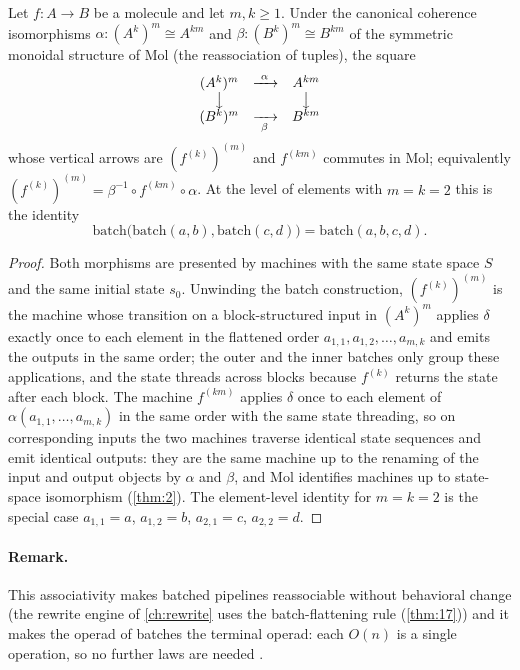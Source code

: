 \begin{theorem}\label{thm:46}
Let $f : A \to B$ be a molecule and let $m, k \geq 1$. Under the canonical coherence isomorphisms $\alpha : (A^{k})^{m} \cong A^{km}$ and $\beta : (B^{k})^{m} \cong B^{km}$ of the symmetric monoidal structure of Mol (the reassociation of tuples), the square
\[
\begin{array}{ccc}
(A^{k})^{m} & \xrightarrow{\ \alpha\ } & A^{km} \\
\big\downarrow & & \big\downarrow \\
(B^{k})^{m} & \xrightarrow[\ \beta\ ]{} & B^{km}
\end{array}
\]
whose vertical arrows are $(f^{(k)})^{(m)}$ and $f^{(km)}$ commutes in Mol; equivalently $(f^{(k)})^{(m)} = \beta^{-1} \circ f^{(km)} \circ \alpha$. At the level of elements with $m = k = 2$ this is the identity
\[
\mathrm{batch}\bigl (\mathrm{batch} (a, b), \mathrm{batch} (c, d)\bigr) = \mathrm{batch} (a, b, c, d) .
\]
\end{theorem}

\begin{proof}
Both morphisms are presented by machines with the same state space $S$ and the same initial state $s_0$. Unwinding the batch construction, $(f^{(k)})^{(m)}$ is the machine whose transition on a block-structured input in $(A^{k})^{m}$ applies $\delta$ exactly once to each element in the flattened order $a_{1,1}, a_{1,2}, \ldots, a_{m,k}$ and emits the outputs in the same order; the outer and the inner batches only group these applications, and the state threads across blocks because $f^{(k)}$ returns the state after each block. The machine $f^{(km)}$ applies $\delta$ once to each element of $\alpha (a_{1,1}, \ldots, a_{m,k})$ in the same order with the same state threading, so on corresponding inputs the two machines traverse identical state sequences and emit identical outputs: they are the same machine up to the renaming of the input and output objects by $\alpha$ and $\beta$, and Mol identifies machines up to state-space isomorphism (\autoref{thm:2}). The element-level identity for $m = k = 2$ is the special case $a_{1,1} = a$, $a_{1,2} = b$, $a_{2,1} = c$, $a_{2,2} = d$.
\end{proof}

\paragraph{Remark.}
This associativity makes batched pipelines reassociable without behavioral change (the rewrite engine of \autoref{ch:rewrite} uses the batch-flattening rule (\autoref{thm:17})) and it makes the operad of batches the terminal operad: each $O (n)$ is a single operation, so no further laws are needed \citep{leinster, kelly}.

